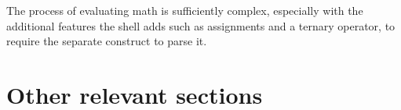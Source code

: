 The process of evaluating math is sufficiently complex, especially with the additional features the shell adds such as assignments and a ternary operator, to require the separate construct to parse it.


















\section{Other relevant sections}